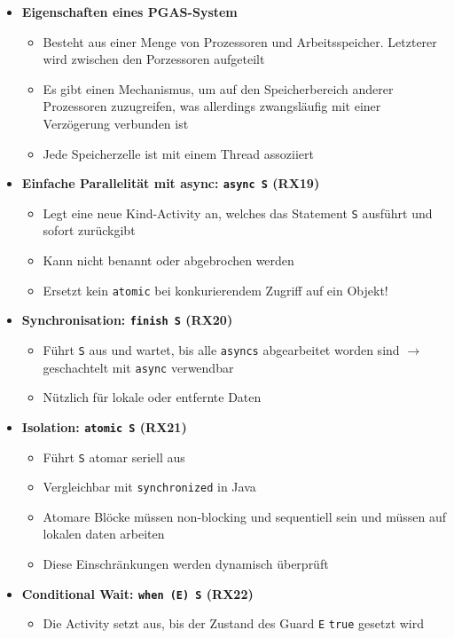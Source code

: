 \begin{itemize}
	\item \textbf{Eigenschaften eines PGAS-System}
	\begin{itemize}
		\item Besteht aus einer Menge von Prozessoren und Arbeitsspeicher. Letzterer wird zwischen den Porzessoren aufgeteilt
		\item Es gibt einen Mechanismus, um auf den Speicherbereich anderer Prozessoren zuzugreifen, was allerdings zwangsläufig mit einer Verzögerung verbunden ist
		\item Jede Speicherzelle ist mit einem Thread assoziiert
	\end{itemize}
	\item \textbf{Einfache Parallelität mit async: \texttt{async S} (RX19)}
	\begin{itemize}
		\item Legt eine neue Kind-Activity an, welches das Statement \texttt{S} ausführt und sofort zurückgibt
		\item Kann nicht benannt oder abgebrochen werden
		\item Ersetzt kein \texttt{atomic} bei konkurierendem Zugriff auf ein Objekt!
	\end{itemize}
	\item \textbf{Synchronisation: \texttt{finish S} (RX20)}
	\begin{itemize}
		\item Führt \texttt{S} aus und wartet, bis alle \texttt{asyncs} abgearbeitet worden sind \(\rightarrow\) geschachtelt mit \texttt{async} verwendbar
		\item Nützlich für lokale oder entfernte Daten
	\end{itemize}
	\item \textbf{Isolation: \texttt{atomic S} (RX21)}
	\begin{itemize}
		\item Führt \texttt{S} atomar seriell aus
		\item Vergleichbar mit \texttt{synchronized} in Java
		\item Atomare Blöcke müssen non-blocking und sequentiell sein und müssen auf lokalen daten arbeiten
		\item Diese Einschränkungen werden dynamisch überprüft
	\end{itemize}
	\item \textbf{Conditional Wait: \texttt{when (E) S} (RX22)}
	\begin{itemize}
		\item Die Activity setzt aus, bis der Zustand des Guard \texttt{E} \texttt{true} gesetzt wird

\end{itemize}
\end{itemize}
